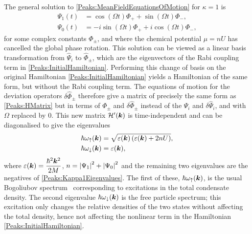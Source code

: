 The general solution to \eqref{Peaks:MeanFieldEquationsOfMotion} for $\kappa = 1$ is
\begin{subequations}
    \label{Peaks:Kappa1MeanFieldSolution}
    \begin{align}
        \Psi_1(t) &= \cos(\Omega t) \Phi_+ + \sin(\Omega t) \Phi_-, \\
        \Psi_0(t) &= -i\sin(\Omega t) \Phi_+ + i\cos(\Omega t) \Phi_-,
    \end{align}
\end{subequations}
for some complex constants $\Phi_\pm$, and where the chemical potential $\mu = n U$ has cancelled the global phase rotation. This solution can be viewed as a linear basis transformation from $\hat{\Psi}_i$ to $\hat{\Phi}_\pm$, which are the eigenvectors of the Rabi coupling term in \eqref{Peaks:InitialHamiltonian}. Performing this change of basis on the original Hamiltonian \eqref{Peaks:InitialHamiltonian} yields a Hamiltonian of the same form, but without the Rabi coupling term. The equations of motion for the deviation operators $\delta\hat{\Phi}_\pm$ therefore give a matrix of precisely the same form as \eqref{Peaks:HMatrix} but in terms of $\Phi_\pm$ and $\delta\hat{\Phi}_\pm$ instead of the $\Psi_i$ and $\delta\hat{\Psi}_i$, and with $\Omega$ replaced by 0. This new matrix $\mathcal{H}'(\bm{k})$ is time-independent and can be diagonalised to give the eigenvalues
\begin{subequations}
    \label{Peaks:Kappa1Eigenvalues}
    \begin{align}
        \hbar \omega_\uparrow(\vect{k}) &= \sqrt{\varepsilon(\vect{k})\left(\varepsilon(\vect{k}) + 2 n U\right)},\\
        \hbar \omega_\downarrow(\vect{k}) &= \varepsilon(\vect{k}),
    \end{align}
\end{subequations}
where $\displaystyle\varepsilon(\bm{k}) = \frac{\hbar^2\bm{k}^2}{2M}$, $n= \left|\Psi_1\right|^2 + \left|\Psi_0\right|^2$ and the remaining two eigenvalues are the negatives of \eqref{Peaks:Kappa1Eigenvalues}. The first of these, $\hbar \omega_\uparrow(\bm{k})$, is the usual Bogoliubov spectrum~\citep{Bogoliubov:1947} corresponding to excitations in the total condensate density. The second eigenvalue $\hbar \omega_\downarrow(\bm{k})$ is the free particle spectrum; this excitation only changes the relative densities of the two states without affecting the total density, hence not affecting the nonlinear term in the Hamiltonian \eqref{Peaks:InitialHamiltonian}.


